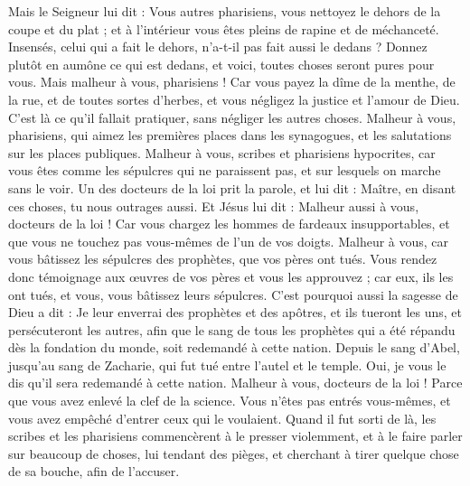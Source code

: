 \begin{multicols}{2}
Mais le Seigneur lui dit : Vous autres pharisiens, vous nettoyez le dehors de la coupe et du plat ; et à l'intérieur vous êtes pleins de rapine et de méchanceté.
Insensés, celui qui a fait le dehors, n'a-t-il pas fait aussi le dedans ?
Donnez plutôt en aumône ce qui est dedans, et voici, toutes choses seront pures pour vous.
Mais malheur à vous, pharisiens ! Car vous payez la dîme de la menthe, de la rue, et de toutes sortes d'herbes, et vous négligez la justice et l'amour de Dieu. C'est là ce qu'il fallait pratiquer, sans négliger les autres choses.
Malheur à vous, pharisiens, qui aimez les premières places dans les synagogues, et les salutations sur les places publiques.
Malheur à vous, scribes et pharisiens hypocrites, car vous êtes comme les sépulcres qui ne paraissent pas, et sur lesquels on marche sans le voir.
Un des docteurs de la loi prit la parole, et lui dit : Maître, en disant ces choses, tu nous outrages aussi.
Et Jésus lui dit : Malheur aussi à vous, docteurs de la loi ! Car vous chargez les hommes de fardeaux insupportables, et que vous ne touchez pas vous-mêmes de l'un de vos doigts.
Malheur à vous, car vous bâtissez les sépulcres des prophètes, que vos pères ont tués.
Vous rendez donc témoignage aux œuvres de vos pères et vous les approuvez ; car eux, ils les ont tués, et vous, vous bâtissez leurs sépulcres.
C'est pourquoi aussi la sagesse de Dieu a dit : Je leur enverrai des prophètes et des apôtres, et ils tueront les uns, et persécuteront les autres,
afin que le sang de tous les prophètes qui a été répandu dès la fondation du monde, soit redemandé à cette nation.
Depuis le sang d'Abel, jusqu'au sang de Zacharie, qui fut tué entre l'autel et le temple. Oui, je vous le dis qu'il sera redemandé à cette nation.
Malheur à vous, docteurs de la loi ! Parce que vous avez enlevé la clef de la science. Vous n'êtes pas entrés vous-mêmes, et vous avez empêché d'entrer ceux qui le voulaient.
Quand il fut sorti de là, les scribes et les pharisiens commencèrent à le presser violemment, et à le faire parler sur beaucoup de choses,
lui tendant des pièges, et cherchant à tirer quelque chose de sa bouche, afin de l'accuser.

\end{multicols}
